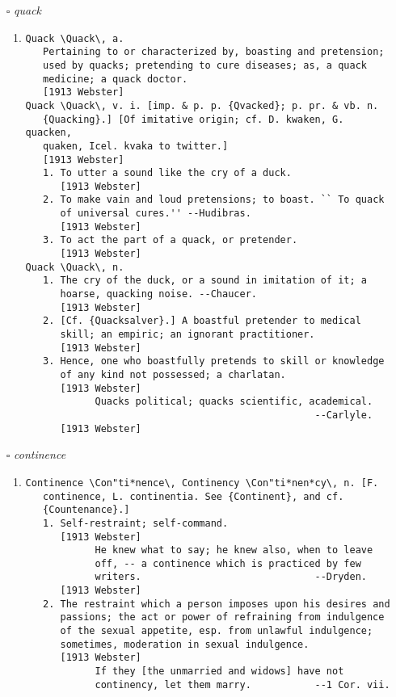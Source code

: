 \documentclass{article}
\begin{document}
\begin{itemize}
\begin{enumerate}
{\begin{lstlisting}
\end{lstlisting}}
\end{enumerate}
\item[$\square$] \emph{ quack }
\begin{enumerate}
\item{
\begin{lstlisting}
Quack \Quack\, a.
   Pertaining to or characterized by, boasting and pretension;
   used by quacks; pretending to cure diseases; as, a quack
   medicine; a quack doctor.
   [1913 Webster]
Quack \Quack\, v. i. [imp. & p. p. {Qvacked}; p. pr. & vb. n.
   {Quacking}.] [Of imitative origin; cf. D. kwaken, G. quacken,
   quaken, Icel. kvaka to twitter.]
   [1913 Webster]
   1. To utter a sound like the cry of a duck.
      [1913 Webster]
   2. To make vain and loud pretensions; to boast. `` To quack
      of universal cures.'' --Hudibras.
      [1913 Webster]
   3. To act the part of a quack, or pretender.
      [1913 Webster]
Quack \Quack\, n.
   1. The cry of the duck, or a sound in imitation of it; a
      hoarse, quacking noise. --Chaucer.
      [1913 Webster]
   2. [Cf. {Quacksalver}.] A boastful pretender to medical
      skill; an empiric; an ignorant practitioner.
      [1913 Webster]
   3. Hence, one who boastfully pretends to skill or knowledge
      of any kind not possessed; a charlatan.
      [1913 Webster]
            Quacks political; quacks scientific, academical.
                                                  --Carlyle.
      [1913 Webster]
\end{lstlisting}}
\end{enumerate}
\item[$\square$] \emph{ continence }
\begin{enumerate}
\item{
\begin{lstlisting}
Continence \Con"ti*nence\, Continency \Con"ti*nen*cy\, n. [F.
   continence, L. continentia. See {Continent}, and cf.
   {Countenance}.]
   1. Self-restraint; self-command.
      [1913 Webster]
            He knew what to say; he knew also, when to leave
            off, -- a continence which is practiced by few
            writers.                              --Dryden.
      [1913 Webster]
   2. The restraint which a person imposes upon his desires and
      passions; the act or power of refraining from indulgence
      of the sexual appetite, esp. from unlawful indulgence;
      sometimes, moderation in sexual indulgence.
      [1913 Webster]
            If they [the unmarried and widows] have not
            continency, let them marry.           --1 Cor. vii.

\end{lstlisting}}
\end{enumerate}
\end{itemize}
\end{document}
